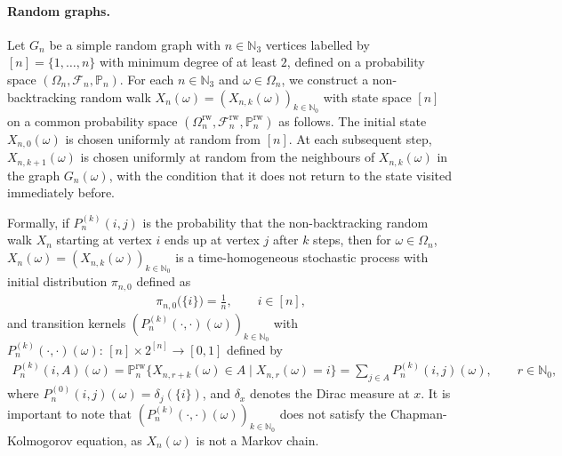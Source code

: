 \documentclass[11pt]{article}
\numberwithin{equation}{section}
\theoremstyle{plain}
\newcommand{\N}{\mathbb N}
\renewcommand{\P}{\mathbb P}
\begin{document}
\paragraph{Random graphs.}

Let $G_{n}$ be a simple random graph with $n \in \N_{3}$ vertices labelled by $[n] = \{1,\ldots,n\}$ with minimum degree of at least $2$, defined on a probability space $(\Omega_{n},\mathcal{F}_{n},\P_{n})$. For each $n \in \N_{3}$ and $\omega\in\Omega_{n}$, we construct a non-backtracking random walk $X_{n}(\omega) = (X_{n,k}(\omega))_{k\in\N_0}$ with state space $[n]$ on a common probability space $(\Omega_{n}^{\mathrm{rw}},\mathcal{F}_{n}^{\mathrm{rw}},\P_{n}^{\mathrm{rw}})$ as follows. The initial state $X_{n,0}(\omega)$ is chosen uniformly at random from $[n]$. At each subsequent step, $X_{n,k+1}(\omega)$ is chosen uniformly at random from the neighbours of $X_{n,k}(\omega)$ in the graph $G_{n}(\omega)$, with the condition that it does not return to the state visited immediately before. 

Formally, if $P_{n}^{(k)}(i,j)$ is the probability that the non-backtracking random walk $X_n$ starting at vertex $i$ ends up at vertex $j$ after $k$ steps, then for $\omega \in \Omega_{n}$, $X_{n}(\omega) = (X_{n,k}(\omega))_{k\in\N_{0}}$ is a time-homogeneous stochastic process with initial distribution $\pi_{n,0}$ defined as
\begin{align*}
\label{initial}
\pi_{n,0}\big(\{i\}\big) = \frac{1}{n}, \qquad i\in[n],
\end{align*}
and transition kernels $(P_{n}^{(k)}(\cdot,\cdot)(\omega))_{k\in\N_0}$ with $P_{n}^{(k)}(\cdot,\cdot)(\omega)\colon\,[n]\times 2^{[n]} \rightarrow [0,1]$ defined by
\begin{align*}
P_{n}^{(k)}(i,A)(\omega) = \P_{n}^{\mathrm{rw}}\big\{X_{n,r+k}(\omega) \in A \mid X_{n,r}(\omega)=i\big\}
= \sum_{j\in A}P_{n}^{(k)}(i,j)(\omega), \qquad r\in\N_{0},
\end{align*}
where $P_{n}^{(0)}(i,j)(\omega) = \delta_{j}(\{i\})$, and $\delta_{x}$ denotes the Dirac measure at $x$. It is important to note that $(P_{n}^{(k)}(\cdot,\cdot)(\omega))_{k\in\N_0}$ does not satisfy the Chapman-Kolmogorov equation, as $X_{n}(\omega)$ is not a Markov chain.
\end{document}
